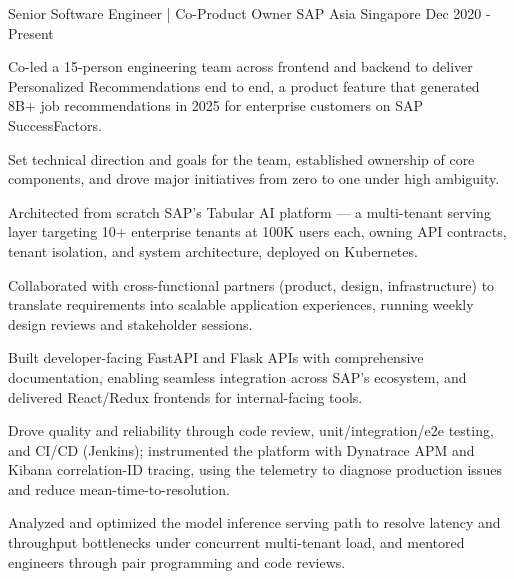 

\begin{cventries}

  \cventry
    {Senior Software Engineer | Co-Product Owner} %
    {SAP Asia} %
    {Singapore} %
    {Dec 2020 - Present} %
    {
      \begin{cvitems} %
        \item {Co-led a 15-person engineering team across frontend and backend to deliver Personalized Recommendations end to end, a product feature that generated 8B+ job recommendations in 2025 for enterprise customers on SAP SuccessFactors.}
        \item {Set technical direction and goals for the team, established ownership of core components, and drove major initiatives from zero to one under high ambiguity.}
        \item {Architected from scratch SAP's Tabular AI platform --- a multi-tenant serving layer targeting 10+ enterprise tenants at 100K users each, owning API contracts, tenant isolation, and system architecture, deployed on Kubernetes.}
        \item {Collaborated with cross-functional partners (product, design, infrastructure) to translate requirements into scalable application experiences, running weekly design reviews and stakeholder sessions.}
        \item {Built developer-facing FastAPI and Flask APIs with comprehensive documentation, enabling seamless integration across SAP's ecosystem, and delivered React/Redux frontends for internal-facing tools.}
        \item {Drove quality and reliability through code review, unit/integration/e2e testing, and CI/CD (Jenkins); instrumented the platform with Dynatrace APM and Kibana correlation-ID tracing, using the telemetry to diagnose production issues and reduce mean-time-to-resolution.}
        \item {Analyzed and optimized the model inference serving path to resolve latency and throughput bottlenecks under concurrent multi-tenant load, and mentored engineers through pair programming and code reviews.}
      \end{cvitems}
    }


\end{cventries}
